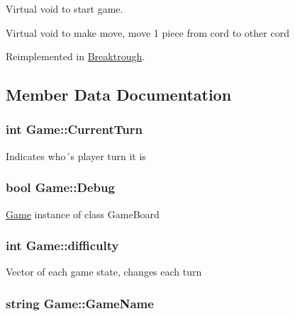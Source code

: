 Virtual void to start game. 

Virtual void to make move, move 1 piece from cord to other cord 

Reimplemented in \hyperlink{class_breaktrough_a1e4b2c80e074f7052c4c491abe95c9f6}{Breaktrough}.



\subsection{Member Data Documentation}
\hypertarget{class_game_a88700a4643e08b12130ba2950c54ed8b}{
\subsubsection[{Current\-Turn}]{\setlength{\rightskip}{0pt plus 5cm}int Game\-::\-Current\-Turn\hspace{0.3cm}{\ttfamily [protected]}}}\label{class_game_a88700a4643e08b12130ba2950c54ed8b}
Indicates who´s player turn it is \hypertarget{class_game_ad79740c2d2fa299cf322bf6ea322d9aa}{
\subsubsection[{Debug}]{\setlength{\rightskip}{0pt plus 5cm}bool Game\-::\-Debug}}\label{class_game_ad79740c2d2fa299cf322bf6ea322d9aa}
\hyperlink{class_game}{Game} instance of class Game\-Board \hypertarget{class_game_a536a6390d16f05d402928bd731e06ef3}{
\subsubsection[{difficulty}]{\setlength{\rightskip}{0pt plus 5cm}int Game\-::difficulty\hspace{0.3cm}{\ttfamily [protected]}}}\label{class_game_a536a6390d16f05d402928bd731e06ef3}
Vector of each game state, changes each turn \hypertarget{class_game_a1b56d5db37d900da0911378cc01f4cad}{
\subsubsection[{Game\-Name}]{\setlength{\rightskip}{0pt plus 5cm}string Game\-::\-Game\-Name\hspace{0.3cm}{\ttfamily [protected]}}}\label{class_game_a1b56d5db37d900da0911378cc01f4cad}
